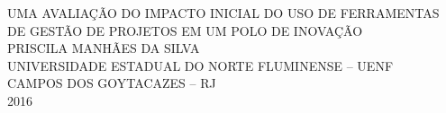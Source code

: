 \begin{titlepage}
  \begin{center}
    {\large UMA AVALIAÇÃO DO IMPACTO INICIAL DO USO DE FERRAMENTAS DE GESTÃO DE PROJETOS EM UM POLO DE INOVAÇÃO} \\ [8cm]
    {\large PRISCILA MANHÃES DA SILVA} \\ [4cm]
    \vfill
    {\large UNIVERSIDADE ESTADUAL DO NORTE FLUMINENSE – UENF} \\ [1cm]
    {\large CAMPOS DOS GOYTACAZES – RJ} \\
    {\large 2016}
  \end{center}
\end{titlepage}
